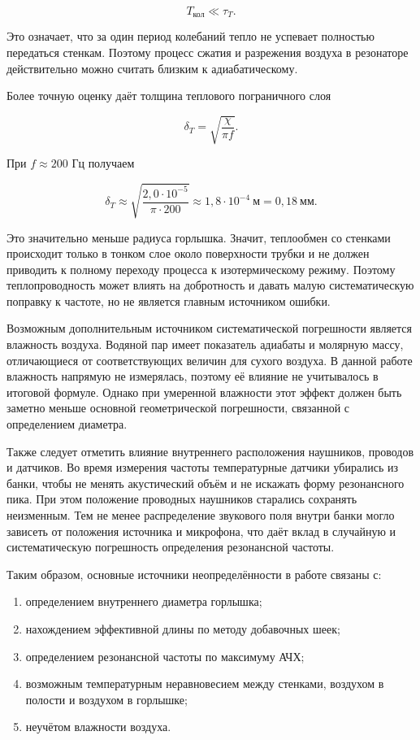 \documentclass[12pt]{extreport}
\begin{document}
	\begin{equation*}
		T_{\text{кол}}\ll \tau_T.
	\end{equation*}
	
	Это означает, что за один период колебаний тепло не успевает полностью передаться стенкам. Поэтому процесс сжатия и разрежения воздуха в резонаторе действительно можно считать близким к адиабатическому.
	
	Более точную оценку даёт толщина теплового пограничного слоя
	
	\begin{equation*}
		\delta_T=\sqrt{\frac{\chi}{\pi f}}.
	\end{equation*}
	
	При \(f\approx200\) Гц получаем
	
	\begin{equation*}
		\delta_T
		\approx
		\sqrt{\frac{2,0\cdot10^{-5}}{\pi\cdot200}}
		\approx
		1,8\cdot10^{-4}\ \text{м}
		=
		0,18\ \text{мм}.
	\end{equation*}
	
	Это значительно меньше радиуса горлышка. Значит, теплообмен со стенками происходит только в тонком слое около поверхности трубки и не должен приводить к полному переходу процесса к изотермическому режиму. Поэтому теплопроводность может влиять на добротность и давать малую систематическую поправку к частоте, но не является главным источником ошибки.
	
	Возможным дополнительным источником систематической погрешности является влажность воздуха. Водяной пар имеет показатель адиабаты и молярную массу, отличающиеся от соответствующих величин для сухого воздуха. В данной работе влажность напрямую не измерялась, поэтому её влияние не учитывалось в итоговой формуле. Однако при умеренной влажности этот эффект должен быть заметно меньше основной геометрической погрешности, связанной с определением диаметра.
	
	Также следует отметить влияние внутреннего расположения наушников, проводов и датчиков. Во время измерения частоты температурные датчики убирались из банки, чтобы не менять акустический объём и не искажать форму резонансного пика. При этом положение проводных наушников старались сохранять неизменным. Тем не менее распределение звукового поля внутри банки могло зависеть от положения источника и микрофона, что даёт вклад в случайную и систематическую погрешность определения резонансной частоты.
	
	Таким образом, основные источники неопределённости в работе связаны с:
	\begin{enumerate}
		\item определением внутреннего диаметра горлышка;
		\item нахождением эффективной длины по методу добавочных шеек;
		\item определением резонансной частоты по максимуму АЧХ;
		\item возможным температурным неравновесием между стенками, воздухом в полости и воздухом в горлышке;
		\item неучётом влажности воздуха.
	\end{enumerate}
	
\end{document}
